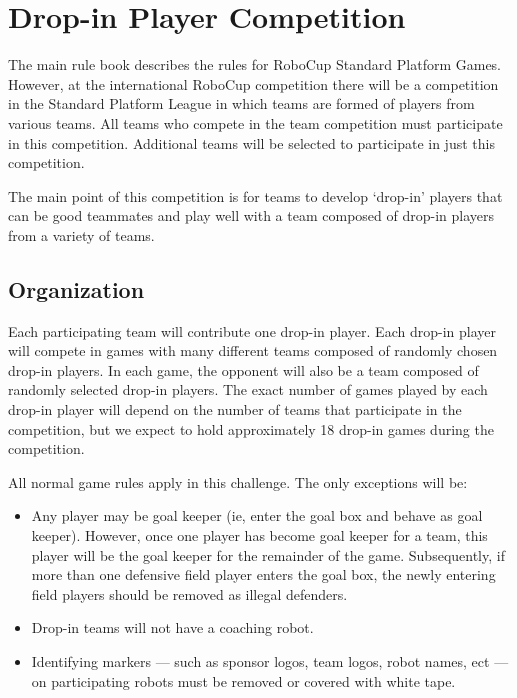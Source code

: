 \documentclass[12pt]{article}
\begin{document}
\newpage


\appendix
\section{Drop-in Player Competition}
\label{sec:drop-in}
The main rule book describes the rules for RoboCup Standard Platform Games.  However, at the international RoboCup competition there will be a competition in the Standard Platform League in which teams are formed of players from various teams.  All teams who compete in the team competition must participate in this competition.  Additional teams will be selected to participate in just this competition.

The main point of this competition is for teams to develop `drop-in' players that can be good teammates and play well with a team composed of drop-in players from a variety of teams.

\subsection{Organization}

Each participating team will contribute one drop-in player.  Each drop-in player will compete in games with many different teams composed of randomly chosen drop-in players.  In each game, the opponent will also be a team composed of randomly selected drop-in players.  The exact number of games played by each drop-in player will depend on the number of teams that participate in the competition, but we expect to hold approximately 18 drop-in games during the competition.

All normal game rules apply in this challenge.  The only exceptions will be:
\begin{itemize}
\item Any player may be goal keeper (ie, enter the goal box and behave as goal keeper).  However, once one player has become goal keeper for a team, this player will be the goal keeper for the remainder of the game.  Subsequently, if more than one defensive field player enters the goal box, the newly entering field players should be removed as illegal defenders.
\item Drop-in teams will not have a coaching robot.
\item Identifying markers --- such as sponsor logos, team logos, robot names, ect --- on participating robots must be removed or covered with white tape.
\end{itemize}
\end{document}
